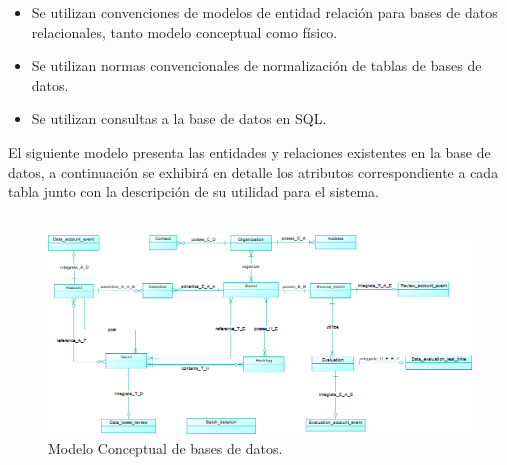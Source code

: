 \documentclass{memoria}
\begin{document}
\begin{itemize}
\item Se utilizan convenciones de modelos de entidad relación para bases de datos relacionales, tanto modelo conceptual como físico.
\item Se utilizan normas convencionales de normalización de tablas de bases de datos.
\item Se utilizan consultas a la base de datos en SQL.
\end{itemize}


El siguiente modelo presenta las entidades y relaciones existentes en la base de datos, a continuación se exhibirá en detalle los atributos correspondiente a cada tabla junto con la descripción de su utilidad para el sistema.\\
\\
\begin{figure}[!ht]
\begin{center}
\includegraphics[width=1\textwidth]{img/conceptual.png}
\caption{Modelo Conceptual de bases de datos.}
\end{center}
\end{figure}
\newpage
\end{document}
